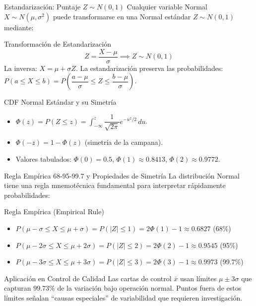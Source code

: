 \documentclass[10pt, aspectratio=169]{beamer}
\begin{document}
\begin{frame}{Estandarización: Puntaje $Z \sim N(0, 1)$}
  \footnotesize
  Cualquier variable Normal $X \sim N(\mu, \sigma^{2})$ puede transformarse en una Normal estándar $Z \sim N(0, 1)$ mediante: \pause

  \vspace{0.1cm}
  \begin{block}{Transformación de Estandarización}
    $$Z = \dfrac{X - \mu}{\sigma} \implies Z \sim N(0, 1)$$
    La inversa: $X = \mu + \sigma Z$. La estandarización preserva las probabilidades: $P(a \le X \le b) = P\left(\dfrac{a - \mu}{\sigma} \le Z \le \dfrac{b - \mu}{\sigma}\right)$.
  \end{block}

  \vspace{0.1cm}
  \pause
  \begin{alertblock}{CDF Normal Estándar y su Simetría}
    \begin{itemize}\itemsep=0.05cm
      \item $\Phi(z) = P(Z \le z) = \int_{-\infty}^{z} \dfrac{1}{\sqrt{2\pi}} e^{-u^{2}/2}\,du$.
      \item $\Phi(-z) = 1 - \Phi(z)$ (simetría de la campana).
      \item Valores tabulados: $\Phi(0) = 0.5$, $\Phi(1) \approx 0.8413$, $\Phi(2) \approx 0.9772$.
    \end{itemize}
  \end{alertblock}
\end{frame}

\begin{frame}{Regla Empírica 68-95-99.7 y Propiedades de Simetría}
  \footnotesize
  La distribución Normal tiene una regla mnemotécnica fundamental para interpretar rápidamente probabilidades: \pause

  \vspace{0.1cm}
  \begin{block}{Regla Empírica (Empirical Rule)}
    \begin{itemize}\itemsep=0.06cm
      \item $P(\mu - \sigma \le X \le \mu + \sigma) = P(|Z| \le 1) = 2\Phi(1) - 1 \approx 0.6827$ (68\%)
      \item $P(\mu - 2\sigma \le X \le \mu + 2\sigma) = P(|Z| \le 2) = 2\Phi(2) - 1 \approx 0.9545$ (95\%)
      \item $P(\mu - 3\sigma \le X \le \mu + 3\sigma) = P(|Z| \le 3) = 2\Phi(3) - 1 \approx 0.9973$ (99.7\%)
    \end{itemize}
  \end{block}

  \vspace{0.1cm}
  \pause
  \begin{alertblock}{Aplicación en Control de Calidad}
    Las cartas de control $\bar{x}$ usan límites $\mu \pm 3\sigma$ que capturan $99.73\%$ de la variación bajo operación normal. Puntos fuera de estos límites señalan ``causas especiales'' de variabilidad que requieren investigación.
  \end{alertblock}
\end{frame}
\end{document}
